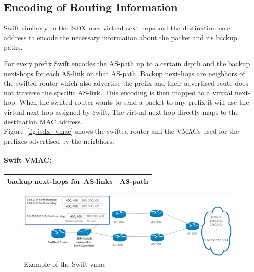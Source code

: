 
\subsection{\label{chapter2:Swift:encoding_of_routing_information}Encoding of Routing Information}
Swift similarly to the iSDX uses virtual next-hops and the destination mac address to encode the necessary information about the packet and its backup paths.

For every prefix Swift encodes the AS-path up to a certain depth and the backup next-hops for each AS-link on that AS-path. Backup next-hops are neigbhors of the swifted router which also advertise the prefix and their advertised route does not traverse the specific AS-link. This encoding is then mapped to a virtual next-hop. When the swifted router wants to send a packet to any prefix it will use the virtual next-hop assigned by Swift. The virtual next-hop directly maps to the destination MAC address. \\
Figure~\ref{fig:isdx_vmac} shows the swifted router and the VMACs used for the prefixes advertised by the neigbhors.

\paragraph{\label{chapter2:Swift:Swift vmac}Swift VMAC:}

\begin{tabular}{|r|l|}
  \hline 
  backup next-hops for AS-links & AS-path \\
  \hline
\end{tabular}


\begin{figure}[h]
\center
\includegraphics[scale = 0.24]{Figures/bckgrnd_swift_topology.pdf}
\caption{Example of the Swift vmac}
\label{fig:swift_vmac}
\end{figure}


